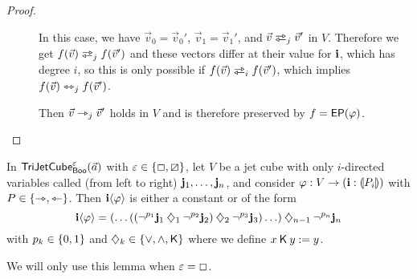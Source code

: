 \documentclass[a4paper]{article}
\begin{document}
\begin{proof}
\begin{description}
		\item[] In this case, we have $\vec v_0 = \vec v_0'$, $\vec v_1 = \vec v_1'$, and $\vec v \infrajet_j \vec v'$ in $V$.
		Therefore we get $f(\vec v) \infrajet_j f(\vec v')$ and these vectors differ at their value for $\mathbf{i}$, which has degree $i$, so this is only possible if $f(\vec v) \infrajet_i f(\vec v')$, which implies $f(\vec v) \leftrightarrowtriangle_j f(\vec v')$.
		
		\item[] Then $\vec v \rightarrowtriangle_j \vec v'$ holds in $V$ and is therefore preserved by $f = \mathsf{EP}(\varphi)$. \qedhere
	\end{description}
\end{proof}
\begin{lemma} \label{thm:char-twisted-cube-to-line}
	In $\mathsf{TriJetCube}^{\varepsilon}_{\mathsf{Boo}}\mathopen{}\left( \vec a \right)\mathclose{}$ with $\varepsilon \in \mathopen{}\left\{ \Box, \boxslash \right\}\mathclose{}$, let $V$ be a jet cube with only $i$-directed variables called (from left to right) $\mathbf{j}_1, \ldots, \mathbf{j}_n$, and consider $\varphi : V \to (\mathbf{i} : {\llparenthesis P_i \rrparenthesis})$ with $P \in \mathopen{}\left\{ \rightarrowtriangle, \leftarrowtriangle \right\}\mathclose{}$.
	Then $\mathbf{i} \langle \varphi \rangle$ is either a constant or of the form
	\[
		\mathbf{i} \langle \varphi \rangle = (\ldots((\lnot^{p_1} \mathbf{j}_1 \mathbin{\diamondsuit}_1 \lnot^{p_2} \mathbf{j}_2) \mathbin{\diamondsuit}_2 \lnot^{p_3} \mathbf{j}_3) \ldots) \mathbin{\diamondsuit}_{n-1} \lnot^{p_n} \mathbf{j}_n
	\]
	with $p_k \in \mathopen{}\left\{ 0, 1 \right\}\mathclose{}$ and $\mathbin{\diamondsuit}_k \in \mathopen{}\left\{ {\vee}, {\wedge}, {\mathbin{\mathsf{K}}} \right\}\mathclose{}$ where we define $x \mathbin{\mathsf{K}} y := y$.
\end{lemma}
We will only use this lemma when $\varepsilon = \Box$.
\end{document}
